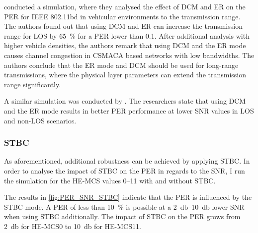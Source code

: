 \textcite{jacob_system-level_2020} conducted a simulation, where they analysed the effect of \ac{DCM} and \ac{ER} on the \ac{PER} for
IEEE 802.11bd in vehicular environments to the transmission range.
The authors found out that using \ac{DCM} and \ac{ER} can
increase the transmission range for \ac{LOS} by \SI{65}{\percent} for a \ac{PER} lower than \num{0.1}.
After additional analysis with higher
vehicle densities, the authors remark that using \ac{DCM} and the \ac{ER} mode causes channel congestion in \ac{CSMACA} based
networks with low bandwidths.
The authors conclude that the \ac{ER} mode and \ac{DCM} should be used for long-range transmissions, where
the physical layer parameters can extend the transmission range significantly.

A similar simulation was conducted by \textcite{triwinarko_phy_2021}.
The researchers state that using \ac{DCM} and the
\ac{ER} mode results in better \ac{PER} performance at lower \ac{SNR} values in \ac{LOS} and non-\ac{LOS} scenarios.

\subsubsection*{\acf{STBC}}
As aforementioned, additional robustness can be achieved by applying \ac{STBC}.
In order to analyse the impact of \ac{STBC} on the \ac{PER} in regards to the \ac{SNR},
I run the simulation for the \ac{HE}-\ac{MCS} values \numrange{0}{11} with and without \ac{STBC}.

The results in \autoref{fig:PER_SNR_STBC} indicate that the \ac{PER} is influenced
by the \ac{STBC} mode. A \ac{PER} of less than \SI{10}{\percent} is possible at a \SIrange{2}{10}{\decibel} lower \ac{SNR} when using \ac{STBC} additionally.
The impact of \ac{STBC} on the \ac{PER} grows from \SI{2}{\decibel} for \ac{HE}-\ac{MCS}\num{0} to \SI{10}{\decibel} for \ac{HE}-\ac{MCS}\num{11}.

